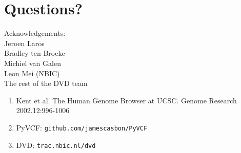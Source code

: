 \documentclass[slidestop]{beamer}
\begin{document}
\section{Questions?}
\lastpagetemplate
\begin{frame}
  \begin{center}
    Acknowledgements:\\
    \vspace{0.8cm}
    Jeroen Laros\\
    Bradley ten Broeke\\
    Michiel van Galen\\
    \vspace{0.8cm}
    Leon Mei (NBIC)\\
    The rest of the DVD team
  \end{center}
  \vspace{1cm}
  {\tiny
    \begin{enumerate}
      \item Kent et al. The Human Genome Browser at UCSC. Genome Research 2002.12:996-1006
      \item PyVCF: \texttt{github.com/jamescasbon/PyVCF}
      \item DVD: \texttt{trac.nbic.nl/dvd}
    \end{enumerate}
  }
\end{frame}
\end{document}
